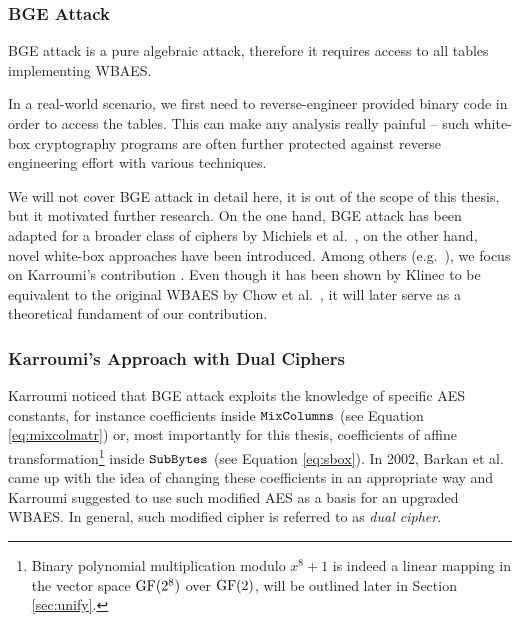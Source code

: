 
\subsubsection{BGE Attack}
	
	BGE attack is a pure algebraic attack, therefore it requires access to all tables implementing WBAES.
	
	\begin{note}
	\label{note:reverse}
		In a real-world scenario, we first need to reverse-engineer provided binary code in order to access the tables. This can make any analysis really painful -- such white-box cryptography programs are often further protected against reverse engineering effort with various techniques.
	\end{note}
	
	We will not cover BGE attack in detail here, it is out of the scope of this thesis, but it motivated further research. On the one hand, BGE attack has been adapted for a broader class of ciphers by Michiels et al.\ \cite{michiels2008cryptanalysis}, on the other hand, novel white-box approaches have been introduced. Among others (e.g.\ \cite{michiels2007cryptographic, xiao2009secure}), we focus on Karroumi's contribution \cite{karroumi2010protecting}. Even though it has been shown by Klinec \cite{klinec2013white} to be equivalent to the original WBAES by Chow et al.\ \cite{chow2002aes}, it will later serve as a theoretical fundament of our contribution.

\subsubsection{Karroumi's Approach with Dual Ciphers}
	
	Karroumi noticed that BGE attack exploits the knowledge of specific AES constants, for instance coefficients inside $\texttt{MixColumns}$ (see Equation \ref{eq:mixcolmatr}) or, most importantly for this thesis, coefficients of affine transformation\footnote{Binary polynomial multiplication modulo $x^8+1$ is indeed a linear mapping in the vector space $\mathrm{GF}(2^8)$ over $\mathrm{GF}(2)$, will be outlined later in Section \ref{sec:unify}.} inside $\texttt{SubBytes}$ (see Equation \ref{eq:sbox}). In 2002, Barkan et al.\ \cite{barkan2002many} came up with the idea of changing these coefficients in an appropriate way and Karroumi suggested to use such modified AES as a basis for an upgraded WBAES. In general, such modified cipher is referred to as {\em dual cipher}.
	
